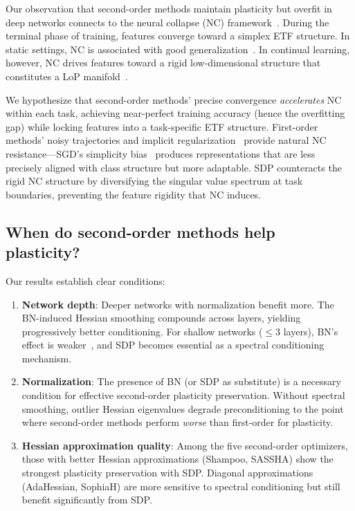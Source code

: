 \documentclass{article}
\begin{document}
Our observation that second-order methods maintain plasticity but overfit in deep networks connects to the neural collapse (NC) framework~\citep{papyan2020prevalence}. During the terminal phase of training, features converge toward a simplex ETF structure. In static settings, NC is associated with good generalization~\citep{galanti2022ncglobal}. In continual learning, however, NC drives features toward a rigid low-dimensional structure that constitutes a LoP manifold~\citep{joudaki2026barriers}.

We hypothesize that second-order methods' precise convergence \emph{accelerates} NC within each task, achieving near-perfect training accuracy (hence the overfitting gap) while locking features into a task-specific ETF structure. First-order methods' noisy trajectories and implicit regularization~\citep{arora2022eos, wen2025implicit} provide natural NC resistance---SGD's simplicity bias~\citep{gatmiry2024simplicity} produces representations that are less precisely aligned with class structure but more adaptable. SDP counteracts the rigid NC structure by diversifying the singular value spectrum at task boundaries, preventing the feature rigidity that NC induces.

\subsection{When do second-order methods help plasticity?}

Our results establish clear conditions:

\begin{enumerate}[leftmargin=*,nosep]
    \item \textbf{Network depth}: Deeper networks with normalization benefit more. The BN-induced Hessian smoothing compounds across layers, yielding progressively better conditioning. For shallow networks ($\leq 3$ layers), BN's effect is weaker~\citep{yao2020pyhessian}, and SDP becomes essential as a spectral conditioning mechanism.
    
    \item \textbf{Normalization}: The presence of BN (or SDP as substitute) is a necessary condition for effective second-order plasticity preservation. Without spectral smoothing, outlier Hessian eigenvalues degrade preconditioning to the point where second-order methods perform \emph{worse} than first-order for plasticity.
    
    \item \textbf{Hessian approximation quality}: Among the five second-order optimizers, those with better Hessian approximations (Shampoo, SASSHA) show the strongest plasticity preservation with SDP. Diagonal approximations (AdaHessian, SophiaH) are more sensitive to spectral conditioning but still benefit significantly from SDP.
\end{enumerate}
\end{document}
